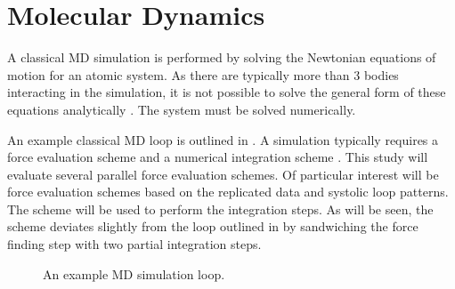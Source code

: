 %
%
\section{Molecular Dynamics}

%
A classical MD simulation is performed by
solving the Newtonian equations of motion for
an atomic system.
%
As there are typically more than 3 bodies interacting in the simulation,
it is not possible to solve the general form of these equations analytically
\cite{vsuvakov2013three}.
%
The system must be solved numerically.

%
An example classical MD loop is outlined in .
%
A simulation typically requires a force evaluation scheme
and a numerical integration scheme
\cite[p.~64]{frenkel2001understanding}.
%
This study will evaluate several parallel force evaluation schemes.
%
Of particular interest will be force evaluation schemes based on
the replicated data and systolic loop patterns.
%
The \velocityverlet{} scheme
\cite{swope1982computer} will be used to perform the integration steps.
%
As will be seen, the \velocityverlet{} scheme deviates slightly from
the loop outlined in  by sandwiching the
force finding step with two partial integration steps.

\begin{figure}
    \begin{center}
    \end{center}
    \caption{An example MD simulation loop.}
    \label{fig:md_loop_flow_chart}
\end{figure}



